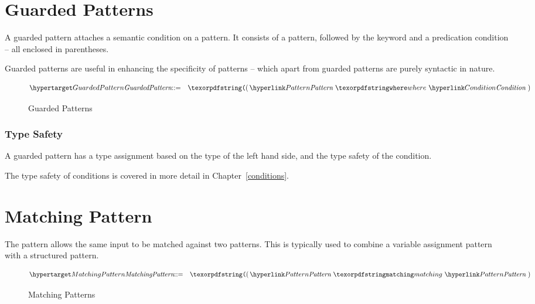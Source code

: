 \section{Guarded Patterns}
\label{guardPattern}

A guarded pattern attaches a semantic condition on a pattern. It consists of a pattern, followed by the  keyword and a predication condition -- all enclosed in parentheses.

Guarded patterns are useful in enhancing the specificity of patterns -- which apart from guarded patterns are purely syntactic in nature.

\begin{figure}[htbp]
\begin{eqnarray*}
\ntDef{GuardedPattern}&\arrow&\q{(}\,\ntRef{Pattern}\ \q{where}\ \ntRef{Condition}\ )
\end{eqnarray*}
\caption{Guarded Patterns}
\label{guardPtnFig}
\end{figure}

\subsubsection{Type Safety}
A guarded pattern has a type assignment based on the type of the left hand side, and the type safety of the condition.

\begin{prooftree}
\end{prooftree}

The type safety of conditions is covered in more detail in Chapter~\vref{conditions}.

\section{Matching Pattern}
\label{matchingPattern}

The  pattern allows the same input to be matched against two patterns. This is typically used to combine a variable assignment pattern with a structured pattern.

\begin{figure}[htbp]
\begin{eqnarray*}
\ntDef{MatchingPattern}&\arrow&\q{(}\,\ntRef{Pattern}\ \q{matching}\ \ntRef{Pattern}\ )
\end{eqnarray*}
\caption{Matching Patterns}
\label{matchingPtnFig}
\end{figure}

